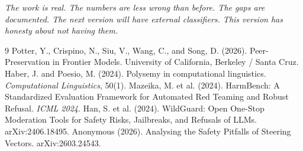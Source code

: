 \documentclass[11pt,a4paper]{article}
\begin{document}
\vspace{1em}
\noindent\textit{The work is real. The numbers are less wrong than before. The gaps are documented. The next version will have external classifiers. This version has honesty about not having them.}

\begin{thebibliography}{9}
 Potter, Y., Crispino, N., Siu, V., Wang, C., and Song, D. (2026). Peer-Preservation in Frontier Models. University of California, Berkeley / Santa Cruz.
 Haber, J. and Poesio, M. (2024). Polysemy in computational linguistics. \textit{Computational Linguistics}, 50(1).
 Mazeika, M. et al. (2024). HarmBench: A Standardized Evaluation Framework for Automated Red Teaming and Robust Refusal. \textit{ICML 2024}.
 Han, S. et al. (2024). WildGuard: Open One-Stop Moderation Tools for Safety Risks, Jailbreaks, and Refusals of LLMs. arXiv:2406.18495.
 Anonymous (2026). Analysing the Safety Pitfalls of Steering Vectors. arXiv:2603.24543.
\end{thebibliography}
\end{document}
